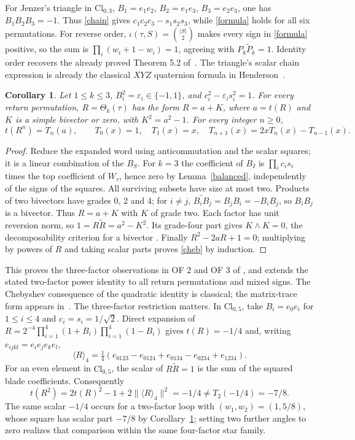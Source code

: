\documentclass[11pt]{article}
\newtheorem{corollary}[theorem]{Corollary}
\newcommand{\inv}{\iota}
\begin{document}
For Jenzer's triangle in $\mathrm{Cl}_{0,3}$,
$B_1=e_1e_2$, $B_2=e_1e_3$, $B_3=e_2e_3$, one has $B_1B_2B_3=-1$.
Thus \eqref{chain} gives $c_1c_2c_3-s_1s_2s_3$, while
\eqref{formula} holds for all six permutations. For reverse order,
$\inv(\tau,S)=\binom{|S|}{2}$ makes every sign in \eqref{formula} positive,
so the sum is $\prod_i(w_i+1-w_i)=1$, agreeing with
$P_k\widetilde P_k=1$. Identity order recovers the already proved
Theorem 5.2 of~\cite{Jenzer}.
The triangle's scalar chain expression is already the classical
$XYZ$ quaternion formula in Henderson~\cite[Section 2.3, Eq.~(24), p.~10]{Henderson}.

\begin{corollary}\label{powers}
Let $1\leq k\leq3$, $B_i^2=\varepsilon_i\in\{-1,1\}$, and
$c_i^2-\varepsilon_i s_i^2=1$. For every return permutation,
$R=\Theta_k(\tau)$ has the form $R=a+K$, where $a=t(R)$ and $K$ is
a simple bivector or zero, with $K^2=a^2-1$. For every integer $n\geq0$,
\begin{equation}\label{cheb}
t(R^n)=T_n(a),\qquad T_0(x)=1,\quad T_1(x)=x,\quad
T_{n+1}(x)=2xT_n(x)-T_{n-1}(x).
\end{equation}
\end{corollary}
\begin{proof}
Reduce the expanded word using anticommutation and the scalar squares;
it is a linear combination of the $B_S$. For $k=3$ the coefficient of
$B_I$ is $\prod_i c_is_i$ times the top coefficient of $W_\tau$, hence
zero by Lemma~\ref{balanced}, independently of the signs of the squares.
All surviving subsets have size at most two. Products of two bivectors
have grades 0, 2 and 4; for $i\ne j$,
$\widetilde{B_iB_j}=B_jB_i=-B_iB_j$, so $B_iB_j$ is a bivector.
Thus $R=a+K$ with $K$ of grade two. Each factor has unit reversion norm,
so $1=R\widetilde R=a^2-K^2$. Its grade-four part gives
$K\wedge K=0$, the decomposability criterion for a bivector
\cite[Section 3.1, Example 3.1]{LS}. Finally $R^2-2aR+1=0$; multiplying
by powers of $R$ and taking scalar parts proves \eqref{cheb} by induction.
\end{proof}
This proves the three-factor observations in OF 2 and OF 3 of
\cite[Section 8.4, pp.~31--32]{Jenzer}, and extends the stated
two-factor power identity to all return permutations and mixed signs.
The Chebyshev consequence of the quadratic identity is classical; the
matrix-trace form appears in~\cite[Theorem 2, Eq.~(9)]{BR}.
The three-factor restriction matters. In $\mathrm{Cl}_{0,5}$, take
$B_i=e_0e_i$ for $1\leq i\leq4$ and $c_i=s_i=1/\sqrt2$.
Direct expansion of
$R=2^{-4}\prod_{i=1}^4(1+B_i)\prod_{i=1}^4(1-B_i)$ gives
$t(R)=-1/4$ and, writing $e_{ijkl}=e_ie_je_ke_l$,
\[
\langle R\rangle_4=\tfrac14(e_{0123}-e_{0124}+e_{0134}-e_{0234}+e_{1234}).
\]
For an even element in $\mathrm{Cl}_{0,5}$, the scalar of
$R\widetilde R=1$ is the sum of the squared blade coefficients.
Consequently
\[
t(R^2)=2t(R)^2-1+2\|\langle R\rangle_4\|^2=-1/4
\ne T_2(-1/4)=-7/8.
\]
The same scalar $-1/4$ occurs for a two-factor loop with
$(w_1,w_2)=(1,5/8)$, whose square has scalar part $-7/8$ by
Corollary~\ref{powers}; setting two further angles to zero realizes
that comparison within the same four-factor star family.
\end{document}
